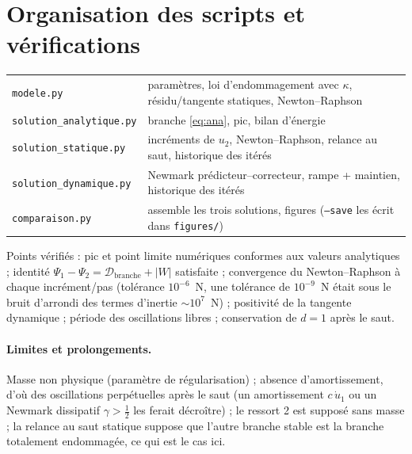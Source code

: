 \documentclass[11pt,a4paper]{article}
\begin{document}
\clearpage
\section{Organisation des scripts et vérifications}
\begin{center}
\begin{tabular}{ll}
\toprule
\texttt{modele.py} & paramètres, loi d'endommagement avec $\kappa$, résidu/tangente statiques, Newton--Raphson\\
\texttt{solution\_analytique.py} & branche \eqref{eq:ana}, pic, bilan d'énergie\\
\texttt{solution\_statique.py} & incréments de $u_2$, Newton--Raphson, relance au saut, historique des itérés\\
\texttt{solution\_dynamique.py} & Newmark prédicteur--correcteur, rampe + maintien, historique des itérés\\
\texttt{comparaison.py} & assemble les trois solutions, figures (\texttt{--save} les écrit dans \texttt{figures/})\\
\bottomrule
\end{tabular}
\end{center}
Points vérifiés : pic et point limite numériques conformes aux valeurs analytiques ; identité
$\Psi_1-\Psi_2 = \mathcal D_{\text{branche}}+|W|$ satisfaite ; convergence du Newton--Raphson à
chaque incrément/pas (tolérance $10^{-6}$~N, une tolérance de $10^{-9}$~N était sous le bruit
d'arrondi des termes d'inertie $\sim10^7$~N) ; positivité de la tangente dynamique ; période des
oscillations libres ; conservation de $d=1$ après le saut.

\paragraph{Limites et prolongements.}
Masse non physique (paramètre de régularisation) ; absence d'amortissement, d'où des oscillations
perpétuelles après le saut (un amortissement $c\,\dot u_1$ ou un Newmark dissipatif $\gamma>\tfrac12$
les ferait décroître) ; le ressort 2 est supposé sans masse ; la relance au saut statique suppose
que l'autre branche stable est la branche totalement endommagée, ce qui est le cas ici.
\end{document}
